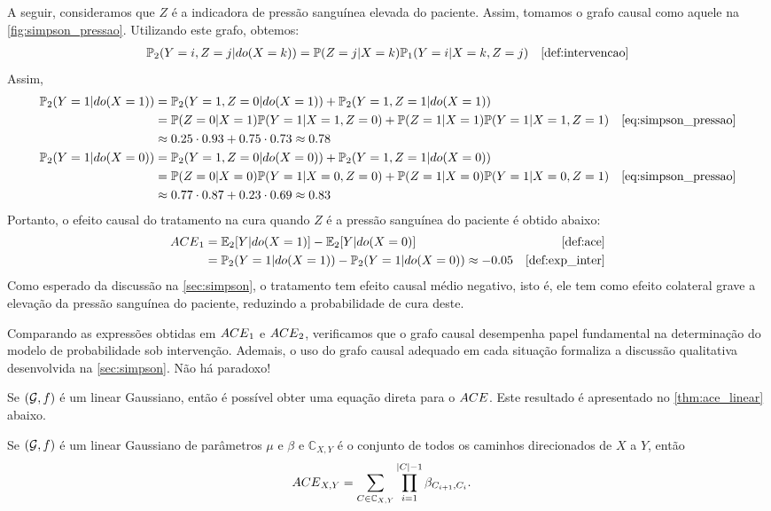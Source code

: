 \begin{example}
 A seguir, consideramos que $Z$ é
 a indicadora de pressão sanguínea elevada do paciente.
 Assim, tomamos o grafo causal como 
 aquele na \cref{fig:simpson_pressao}.
 Utilizando este grafo, obtemos:
 \begin{align}
  \label{eq:simpson_pressao}
  \P_2(Y=i,Z=j|do(X=k))
  &= \P(Z=j|X=k)\P_1(Y=i|X=k,Z=j) 
  & \text{\cref{def:intervencao}}
 \end{align}
 Assim,
 \begin{align*}
  \P_2(Y=1|do(X=1))
  &= \P_2(Y=1,Z=0|do(X=1)) + \P_2(Y=1,Z=1|do(X=1)) \\
  &= \P(Z=0|X=1)\P(Y=1|X=1,Z=0) + \P(Z=1|X=1)\P(Y=1|X=1,Z=1)
  & \text{\cref{eq:simpson_pressao}} \\
  &\approx 0.25 \cdot 0.93 + 0.75 \cdot 0.73 \approx 0.78 \\
  \P_2(Y=1|do(X=0))
  &= \P_2(Y=1,Z=0|do(X=0)) + \P_2(Y=1,Z=1|do(X=0)) \\
  &= \P(Z=0|X=0)\P(Y=1|X=0,Z=0) + \P(Z=1|X=0)\P(Y=1|X=0,Z=1)
  & \text{\cref{eq:simpson_pressao}} \\
  &\approx 0.77 \cdot 0.87 + 0.23 \cdot 0.69 \approx 0.83 \\
 \end{align*}
 Portanto, o efeito causal do tratamento na cura quando
 $Z$ é a pressão sanguínea do paciente é obtido abaixo:
 \begin{align*}
  \ACE_1 &= \E_2[Y|do(X=1)] - \E_2[Y|do(X=0)] 
  & \text{\cref{def:ace}} \\
  &= \P_2(Y=1|do(X=1)) - \P_2(Y=1|do(X=0)) \approx -0.05
  & \text{\cref{def:exp_inter}}
 \end{align*}
 Como esperado da discussão na \cref{sec:simpson},
 o tratamento tem efeito causal médio negativo, isto é,
 ele tem como efeito colateral grave a
 elevação da pressão sanguínea do paciente,
 reduzindo a probabilidade de cura deste.
 
 Comparando as expressões obtidas em ${ACE}_1$ e ${ACE}_2$,
 verificamos que o grafo causal desempenha papel fundamental
 na determinação do modelo de probabilidade sob intervenção.
 Ademais, o uso do grafo causal adequado em cada situação formaliza
 a discussão qualitativa desenvolvida na \cref{sec:simpson}.
 Não há paradoxo!
\end{example}

Se $({\mathcal G},f)$ é um \CM linear Gaussiano, então é
possível obter uma equação direta para o ${ACE}$.
Este resultado é apresentado no \cref{thm:ace_linear} abaixo.

\begin{theorem}
 \label{thm:ace_linear}
 Se $({\mathcal G},f)$ é um \CM linear Gaussiano
 de parâmetros $\mu$ e $\beta$ e
 $\mathbb{C}_{X,Y}$ é o conjunto de
 todos os caminhos direcionados de $X$ a $Y$, então
 \begin{align*}
  {ACE}_{X,Y} &=
  \sum_{C \in \mathbb{C}_{X,Y}} \prod_{i=1}^{|C|-1} \beta_{C_{i+1},C_i}.
 \end{align*}
\end{theorem}

